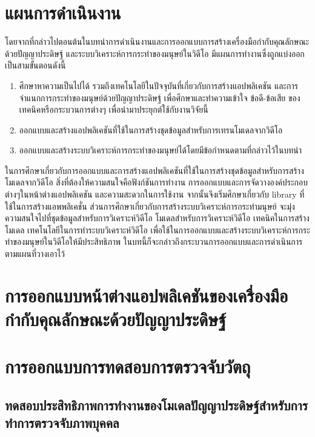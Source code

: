 \vspace{3mm}
\section{แผนการดำเนินงาน}
โดยจากที่กล่าวไปตอนต้นในบทนำการดำเนินงานและการออกแบบการสร้างเครื่องมือกำกับคุณลักษณะด้วยปัญญาประดิษฐ์
และระบบวิเคราะห์การกระทำของมนุษย์ในวิดีโอ มีแผนการทำงานซึ่งถูกแบ่งออกเป็นสามขั้นตอนดังนี้
\begin{enumerate}
	\setlength\itemsep{-0.25em}
	\item ศึกษาหาความเป็นไปได้ รวมถึงเทคโนโลยีในปัจจุบันที่เกี่ยวกับการสร้างแอปพลิเคชัน และการจำแนกการกระทำของมนุษย์ด้วยปัญญาประดิษฐ์ 
	เพื่อศึกษาและทำความเข้าใจ ข้อดี-ข้อเสีย ของเทคนิคหรือกระบวนการต่างๆ เพื่อนำมาประยุกต์ใช้กับงานวิจัยนี้
	\item ออกแบบและสร้างแอปพลิเคชันที่ใช้ในการสร้างชุดข้อมูลสำหรับการเทรนโมเดลจากวิดีโอ
	\item ออกแบบและสร้างระบบวิเคราะห์การกระทำของมนุษย์ได้โดยมีข้อกำหนดตามที่กล่าวไว้ในบทนำ
\end{enumerate}
\clearpage

ในการศึกษาเกี่ยวกับการออกแบบและการสร้างแอปพลิเคชันที่ใช้ในการสร้างชุดข้อมูลสำหรับการสร้างโมเดลจากวิดีโอ 
สิ่งที่ต้องให้ความสนใจคือฟังก์ชันการทำงาน การออกแบบและการจัดวางองค์ประกอบต่างๆในหน้าต่างแอปพลิเคชัน
และความสะดวกในการใช้งาน จากนั้นจึงเริ่มศึกษาเกี่ยวกับ library ที่ใช้ในการสร้างแอพพลิเคชั่น
ส่วนการศึกษาเกี่ยวกับการสร้างระบบวิเคราะห์การกระทำมนุษย์ จะมุ่งความสนใจไปที่ชุดข้อมูลสำหรับการวิเคราะห์วิดีโอ
โมเดลสำหรับการวิเคราะห์วิดีโอ เทคนิคในการสร้างโมเดล เทคโนโลยีในการทำระบบวิเคราะห์วิดีโอ
เพื่อใช้ในการออกแบบและสร้างระบบวิเคราะห์การกระทำของมนุษย์ในวิดีโอให้มีประสิทธิภาพ
ในบทนี้ก็จะกล่าวถึงกระบวนการออกแบบและการดำเนินการตามแผนที่วางเอาไว้
\section{การออกแบบหน้าต่างแอปพลิเคชันของเครื่องมือกำกับคุณลักษณะด้วยปัญญาประดิษฐ์}

\clearpage

\section{การออกแบบการทดสอบการตรวจจับวัตถุ}
\subsection{ทดสอบประสิทธิภาพการทำงานของโมเดลปัญญาประดิษฐ์สำหรับการทำการตรวจจับภาพบุคคล}

\clearpage

